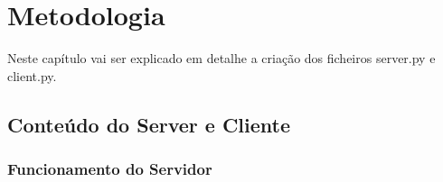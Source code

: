 \documentclass{report}
\begin{document}
\chapter{Metodologia}
\label{chap.metodologia}
Neste capítulo vai ser explicado em detalhe a criação dos ficheiros server.py e client.py.

\section{Conteúdo do Server e Cliente}

\subsection{Funcionamento do Servidor}
 
\end{document}
